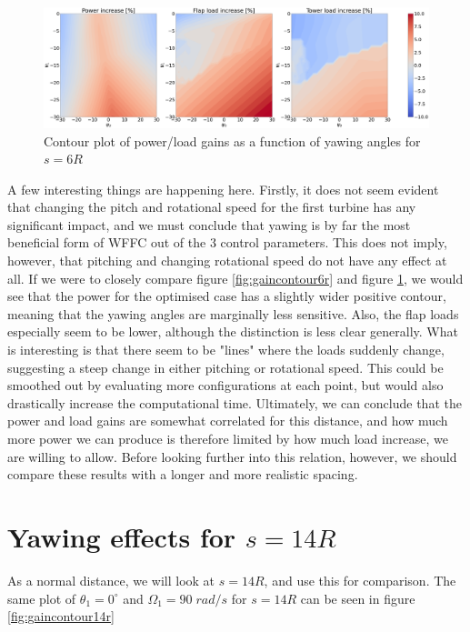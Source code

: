 \begin{figure}[H]
    \centering
    \includegraphics[scale=0.14]{Illustrations/yaw1_yaw2_unlocked.png}
    \caption{Contour plot of power/load gains as a function of yawing angles for $s=6R$}
    \label{fig:yaw_unlocked}
\end{figure}

A few interesting things are happening here. Firstly, it does not seem evident that changing the pitch and rotational speed for the first turbine has any significant impact, and we must conclude that yawing is by far the most beneficial form of WFFC out of the 3 control parameters. This does not imply, however, that pitching and changing rotational speed do not have any effect at all. If we were to closely compare figure \ref{fig:gaincontour6r} and figure \ref{fig:yaw_unlocked}, we would see that the power for the optimised case has a slightly wider positive contour, meaning that the yawing angles are marginally less sensitive. Also, the flap loads especially seem to be lower, although the distinction is less clear generally. What is interesting is that there seem to be "lines" where the loads suddenly change, suggesting a steep change in either pitching or rotational speed. This could be smoothed out by evaluating more configurations at each point, but would also drastically increase the computational time. Ultimately, we can conclude that the power and load gains are somewhat correlated for this distance, and how much more power we can produce is therefore limited by how much load increase, we are willing to allow. Before looking further into this relation, however, we should compare these results with a longer and more realistic spacing. 





\section{Yawing effects for $s=14R$}

As a normal distance, we will look at $s=14R$, and use this for comparison. The same plot of $\theta_1=0^\circ$ and $\Omega_1=90 \; rad/s$ for $s=14R$ can be seen in figure \ref{fig:gaincontour14r}


